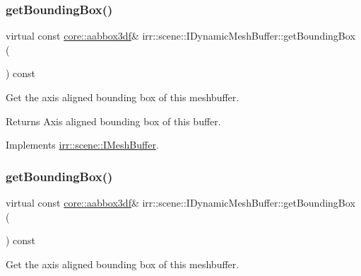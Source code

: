 \subsubsection{\texorpdfstring{get\+Bounding\+Box()}{getBoundingBox()}\hspace{0.1cm}{\footnotesize\ttfamily [1/2]}}
{\footnotesize\ttfamily virtual const \hyperlink{namespaceirr_1_1core_a60f4b4c744aba55f10530d503c6ecb04}{core\+::aabbox3df}\& irr\+::scene\+::\+I\+Dynamic\+Mesh\+Buffer\+::get\+Bounding\+Box (\begin{DoxyParamCaption}{ }\end{DoxyParamCaption}) const\hspace{0.3cm}{\ttfamily [pure virtual]}}



Get the axis aligned bounding box of this meshbuffer. 

\begin{DoxyReturn}{Returns}
Axis aligned bounding box of this buffer. 
\end{DoxyReturn}


Implements \hyperlink{classirr_1_1scene_1_1IMeshBuffer_ac53fe1096756a40f25dae25911e27c51}{irr\+::scene\+::\+I\+Mesh\+Buffer}.

\mbox{\label{classirr_1_1scene_1_1IDynamicMeshBuffer_a9053baee5a13c8b51e306d99e5ef7427}} 
\subsubsection{\texorpdfstring{get\+Bounding\+Box()}{getBoundingBox()}\hspace{0.1cm}{\footnotesize\ttfamily [2/2]}}
{\footnotesize\ttfamily virtual const \hyperlink{namespaceirr_1_1core_a60f4b4c744aba55f10530d503c6ecb04}{core\+::aabbox3df}\& irr\+::scene\+::\+I\+Dynamic\+Mesh\+Buffer\+::get\+Bounding\+Box (\begin{DoxyParamCaption}{ }\end{DoxyParamCaption}) const\hspace{0.3cm}{\ttfamily [pure virtual]}}



Get the axis aligned bounding box of this meshbuffer. 


